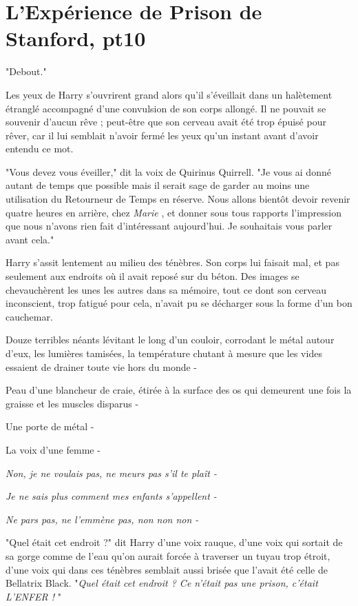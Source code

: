 
\chapter{L'Expérience de Prison de Stanford, pt10}

"Debout."

Les yeux de Harry s'ouvrirent grand alors qu'il s'éveillait dans un halètement étranglé accompagné d'une convulsion de son corps allongé. Il ne pouvait se souvenir d'aucun rêve ; peut-être que son cerveau avait été trop épuisé pour rêver, car il lui semblait n'avoir fermé les yeux qu'un instant avant d'avoir entendu ce mot.

"Vous devez vous éveiller," dit la voix de Quirinus Quirrell. "Je vous ai donné autant de temps que possible mais il serait sage de garder au moins une utilisation du Retourneur de Temps en réserve. Nous allons bientôt devoir revenir quatre heures en arrière, chez \emph{Marie} , et donner sous tous rapports l'impression que nous n'avons rien fait d'intéressant aujourd'hui. Je souhaitais vous parler avant cela."

Harry s'assit lentement au milieu des ténèbres. Son corps lui faisait mal, et pas seulement aux endroits où il avait reposé sur du béton. Des images se chevauchèrent les unes les autres dans sa mémoire, tout ce dont son cerveau inconscient, trop fatigué pour cela, n'avait pu se décharger sous la forme d'un bon cauchemar.

Douze terribles néants lévitant le long d'un couloir, corrodant le métal autour d'eux, les lumières tamisées, la température chutant à mesure que les vides essaient de drainer toute vie hors du monde -

Peau d'une blancheur de craie, étirée à la surface des os qui demeurent une fois la graisse et les muscles disparus -

Une porte de métal -

La voix d'une femme -

\emph{Non, je ne voulais pas, ne meurs pas s'il te plaît -} 

\emph{Je ne sais plus comment mes enfants s'appellent -} 

\emph{Ne pars pas, ne l'emmène pas, non non non -} 

"Quel était cet endroit ?" dit Harry d'une voix rauque, d'une voix qui sortait de sa gorge comme de l'eau qu'on aurait forcée à traverser un tuyau trop étroit, d'une voix qui dans ces ténèbres semblait aussi brisée que l'avait été celle de Bellatrix Black. "\emph{Quel était cet endroit ? Ce n'était pas une prison, c'était L'ENFER !} "

